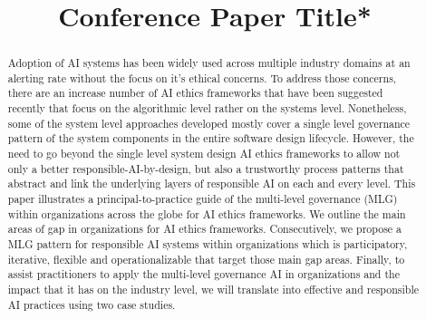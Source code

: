 \documentclass[conference]{IEEEtran}
\begin{document}
\nocite{*}

\title{Conference Paper Title*\\
}

\author{

\and

}

\maketitle

\begin{abstract}
	Adoption of AI systems has been widely used across multiple industry domains at an alerting rate without the focus on it's ethical concerns. To address those concerns, there are an increase number of AI ethics frameworks that have been suggested recently that focus on the algorithmic level rather on the systems level. Nonetheless, some of the system level approaches developed mostly cover a single level governance pattern of the system components in the entire software design lifecycle. However, the need to go beyond the single level  system design AI ethics frameworks to allow not only a better responsible-AI-by-design, but also a trustworthy process patterns that abstract and link the underlying layers of responsible AI on each and every level. This paper illustrates a principal-to-practice guide of the multi-level governance (MLG) within organizations across the globe for AI ethics frameworks. We outline the main areas of gap in organizations for AI ethics frameworks. Consecutively, we propose a MLG pattern for responsible AI systems within organizations which is participatory, iterative, flexible and operationalizable that target those main gap areas. Finally, to assist practitioners to apply the multi-level governance AI in organizations and the impact that it has on the industry level, we will translate into effective and responsible AI practices using two case studies.
\end{abstract}
\end{document}
